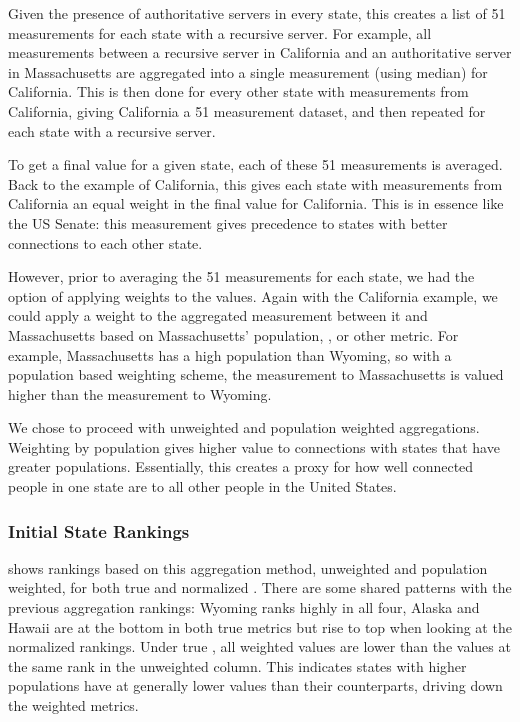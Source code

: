Given the presence of authoritative servers in every state, this creates a list of 51 measurements for each state with a recursive server. For example, all measurements between a recursive server in California and an authoritative server in Massachusetts are aggregated into a single measurement (using median) for California. This is then done for every other state with measurements from California, giving California a 51 measurement dataset, and then repeated for each state with a recursive server. 

To get a final value for a given state, each of these 51 measurements is averaged. Back to the example of California, this gives each state with measurements from California an equal weight in the final value for California. This is in essence like the US Senate: this measurement gives precedence to states with better connections to each other state.

However, prior to averaging the 51 measurements for each state, we had the option of applying weights to the values. Again with the California example, we could apply a weight to the aggregated measurement between it and Massachusetts based on Massachusetts' population, \gdp, or other metric. For example, Massachusetts has a high population than Wyoming, so with a population based weighting scheme, the measurement to Massachusetts is valued higher than the measurement to Wyoming.

We chose to proceed with unweighted and population weighted aggregations. Weighting by population gives higher value to connections with states that have greater populations. Essentially, this creates a proxy for how well connected people in one state are to all other people in the United States.

\subsubsection{Initial State Rankings}

 shows rankings based on this aggregation method, unweighted and population weighted, for both true \dns \rtt and normalized \dns \rtt. There are some shared patterns with the previous aggregation rankings: Wyoming ranks highly in all four, Alaska and Hawaii are at the bottom in both true \rtt metrics but rise to top when looking at the normalized rankings. Under true \rtt, all weighted \rtt values are lower than the values at the same rank in the unweighted column. This indicates states with higher populations have at generally lower values than their counterparts, driving down the weighted metrics.

